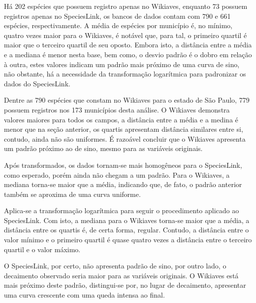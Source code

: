 \begin{resposta}
Há 202 espécies que possuem registro apenas no Wikiaves, enquanto 73 possuem registros apenas no SpeciesLink, os bancos de dados contam com 790 e 661 espécies, respectivamente. A média de espécies por município é, no mínimo, quatro vezes maior para o Wikiaves, é notável que, para tal, o primeiro quartil é maior que o terceiro quartil de seu oposto. Embora isto, a distância entre a média e a mediana é menor nesta base, bem como, o desvio padrão é o dobro em relação à outra, estes valores indicam um padrão mais próximo de uma curva de sino, não obstante, há a necessidade da transformação logarítmica para padronizar os dados do SpeciesLink.

Dentre as 790 espécies que constam no Wikiaves para o estado de São Paulo, 779 possuem registros nos 173 municípios desta análise. O Wikiaves demonstra valores maiores para todos os campos, a distância entre a média e a medina é menor que na seção anterior, os quartis apresentam distância similares entre si, contudo, ainda não são uniformes. É razoável concluir que o Wikiaves apresenta um padrão próximo ao de sino, mesmo para as variáveis originais.

Após transformados, os dados tornam-se mais homogêneos para o SpeciesLink, como esperado, porém ainda não chegam a um padrão. Para o Wikiaves, a mediana torna-se maior que a média, indicando que, de fato, o padrão anterior também se aproxima de uma curva uniforme.

Aplica-se a transformação logarítmica para seguir o procedimento aplicado ao SpeciesLink. Com isto, a mediana para o Wikiaves torna-se maior que a média, a distância entre os quartis é, de certa forma, regular. Contudo, a distância entre o valor mínimo e o primeiro quartil é quase quatro vezes a distância entre o terceiro quartil e o valor máximo.

O SpeciesLink, por certo, não apresenta padrão de sino, por outro lado, o decaimento observado seria maior para as variáveis originais. O Wikiaves está mais próximo deste padrão, distingui-se por, no lugar de decaimento, apresentar uma curva crescente com uma queda intensa ao final.
\end{resposta}



